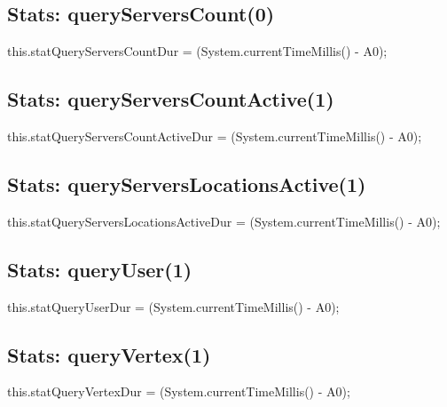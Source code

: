 \subsection{Stats: queryServersCount(0)}
\nwenddocs{}\endmoddef{}
this.statQueryServersCountDur = (System.currentTimeMillis() - A0);
\nwendcode{}\nwdocspar

\subsection{Stats: queryServersCountActive(1)}
\nwenddocs{}\endmoddef{}
this.statQueryServersCountActiveDur = (System.currentTimeMillis() - A0);
\nwendcode{}\nwdocspar

\subsection{Stats: queryServersLocationsActive(1)}
\nwenddocs{}\endmoddef{}
this.statQueryServersLocationsActiveDur = (System.currentTimeMillis() - A0);
\nwendcode{}\nwdocspar

\subsection{Stats: queryUser(1)}
\nwenddocs{}\endmoddef{}
this.statQueryUserDur = (System.currentTimeMillis() - A0);
\nwendcode{}\nwdocspar

\subsection{Stats: queryVertex(1)}
\nwenddocs{}\endmoddef{}
this.statQueryVertexDur = (System.currentTimeMillis() - A0);
\nwendcode{}\nwdocspar

